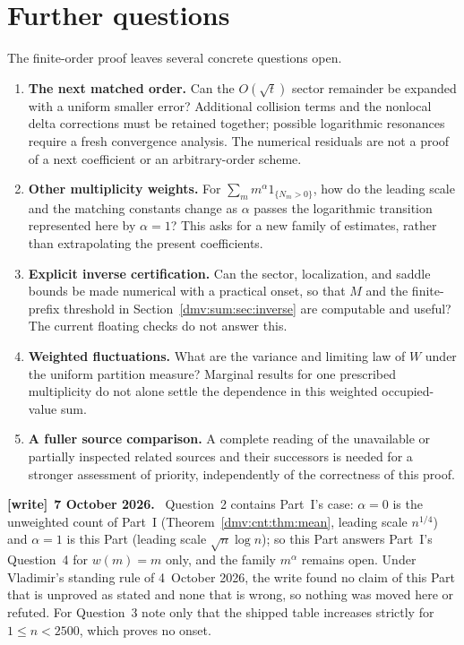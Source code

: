 \documentclass[11pt,letterpaper]{article}
\numberwithin{equation}{section}
\theoremstyle{definition}\newtheorem{definition}[theorem]{Definition}
\theoremstyle{remark}\newtheorem{remark}[theorem]{Remark}
\newenvironment{writenote}[1][]{\par\smallskip\begingroup\small
 \noindent\textbf{[write]}\if\relax\detokenize{#1}\relax\else~\textbf{#1.}\fi\ }%
 {\par\endgroup\smallskip}
\begin{document}
\section{Further questions}\label{dmv:sum:sec:further}
The finite-order proof leaves several concrete questions open.
\begin{enumerate}[leftmargin=1.5em]
\item \textbf{The next matched order.} Can the $O(\sqrt t)$ sector remainder be expanded with a uniform smaller error? Additional collision terms and the nonlocal delta corrections must be retained together; possible logarithmic resonances require a fresh convergence analysis. The numerical residuals are not a proof of a next coefficient or an arbitrary-order scheme.
\item \textbf{Other multiplicity weights.} For $\sum_m m^\alpha1_{\{N_m>0\}}$, how do the leading scale and the matching constants change as $\alpha$ passes the logarithmic transition represented here by $\alpha=1$? This asks for a new family of estimates, rather than extrapolating the present coefficients.
\item \textbf{Explicit inverse certification.} Can the sector, localization, and saddle bounds be made numerical with a practical onset, so that $M$ and the finite-prefix threshold in Section~\ref{dmv:sum:sec:inverse} are computable and useful? The current floating checks do not answer this.
\item \textbf{Weighted fluctuations.} What are the variance and limiting law of $W$ under the uniform partition measure? Marginal results for one prescribed multiplicity do not alone settle the dependence in this weighted occupied-value sum.
\item \textbf{A fuller source comparison.} A complete reading of the unavailable or partially inspected related sources and their successors is needed for a stronger assessment of priority, independently of the correctness of this proof.
\end{enumerate}
\begin{writenote}[7 October 2026]
Question~2 contains Part~I's case: $\alpha=0$ is the unweighted count of
Part~I (Theorem~\ref{dmv:cnt:thm:mean}, leading scale $n^{1/4}$) and
$\alpha=1$ is this Part (leading scale $\sqrt n\log n$); so this Part
answers Part~I's Question~4 for $w(m)=m$ only, and the family $m^\alpha$
remains open. Under Vladimir's standing rule of
4~October 2026, the write found no claim of this Part that is unproved as
stated and none that is wrong, so nothing was moved here or refuted. For
Question~3 note only that the shipped table increases strictly for
$1\le n<2500$, which proves no onset.
\end{writenote}
\end{document}
